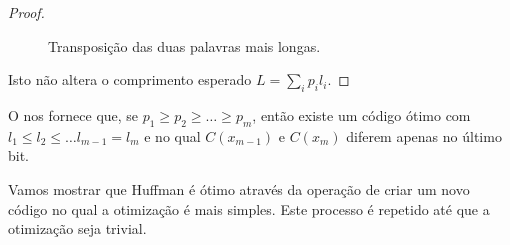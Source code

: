 \begin{proof}
\begin{figure}[h!]
\caption{Transposição das duas palavras mais longas.}\label{fig:lemmahuffman2}
\end{figure}

Isto não altera o comprimento esperado $L = \sum_i p_i l_i$.
\end{proof}



O  nos fornece que, se $p_1 \geq p_2 \geq \ldots \geq p_m$, 
então existe um código ótimo com $l_1 \leq l_2 \leq \ldots l_{m-1} = l_m$
e no qual $C(x_{m-1})$ e $C(x_m)$ diferem apenas no último bit.

Vamos mostrar que Huffman é ótimo através da operação de criar um novo código no qual a otimização é mais simples.
Este processo é repetido até que a otimização seja trivial.


